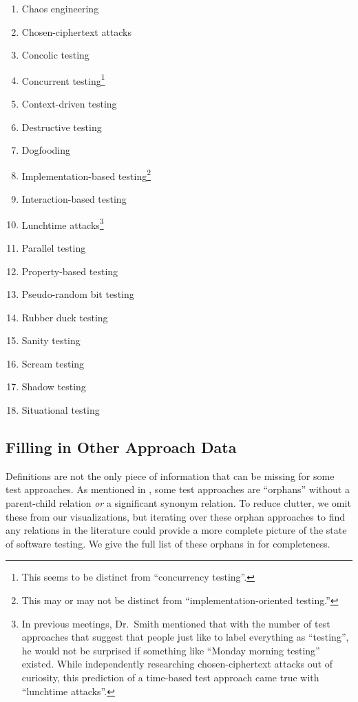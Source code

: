 \begin{minipage}{0.92\textwidth}
    \centering
    \begin{multicols}{2}
        \begin{enumerate}
            \item Chaos engineering
            \item Chosen-ciphertext attacks
            \item Concolic testing
            \item Concurrent testing\footnote{This seems to be distinct from
                      ``concurrency testing''.}
            \item Context-driven testing
            \item Destructive testing
            \item Dogfooding
            \item Implementation-based testing\footnote{This may or may not be
                      distinct from ``implementation-oriented testing.''}
            \item Interaction-based testing
            \item Lunchtime attacks\footnote{In previous meetings, Dr.~Smith
                      mentioned that with the number of test approaches that
                      suggest that people just like to label everything as
                      ``testing'', he would not be surprised if something
                      like ``Monday morning testing'' existed. While
                      independently researching chosen-ciphertext attacks
                      out of curiosity, this prediction of a time-based
                      test approach came true with ``lunchtime attacks''.}
            \item Parallel testing
            \item Property-based testing
            \item Pseudo-random bit testing
            \item Rubber duck testing
            \item Sanity testing
            \item Scream testing
            \item Shadow testing
            \item Situational testing
        \end{enumerate}
    \end{multicols}
\end{minipage}

\subsection{Filling in Other Approach Data}\label{future-app-data}
Definitions are not the only piece of information that can be missing for some
test approaches. As mentioned in , some test approaches are
``orphans'' without a parent-child relation \emph{or} a significant synonym
relation. To reduce clutter, we omit these from our visualizations, but
iterating over these orphan approaches to find any relations in the literature
could provide a more complete picture of the state of software testing. We give
the full list of these orphans in  for completeness.

